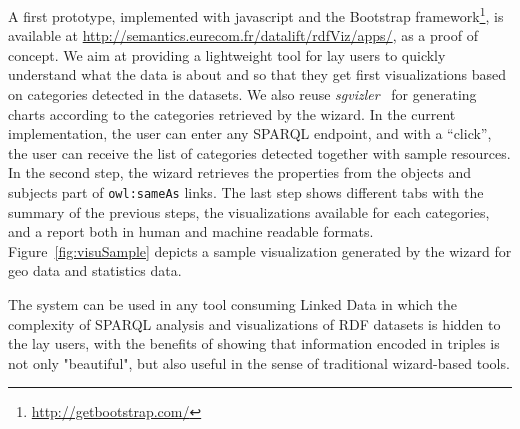 A first prototype, implemented with javascript and the Bootstrap framework\footnote{\url{http://getbootstrap.com/}}, is available at \url{http://semantics.eurecom.fr/datalift/rdfViz/apps/}, as a proof of concept. We aim at providing a lightweight tool for lay users to quickly understand what the data is about and so that they get first visualizations based on categories detected in the datasets. We also reuse \textit{sgvizler}~\cite{Martin2012} for generating charts according to the categories retrieved by the wizard. In the current implementation, the user can enter any SPARQL endpoint, and with a ``click'', the user can receive the list of categories detected together with sample resources. In the second step, the wizard retrieves the properties from the objects and subjects part of \texttt{owl:sameAs} links. The last step shows different tabs with the summary of the previous steps, the visualizations available for each categories, and a report both in human and machine readable formats. Figure~\ref{fig:visuSample} depicts a sample visualization generated by the wizard for geo data and statistics data.

The system can be used in any tool consuming Linked Data in which the complexity of SPARQL analysis and visualizations of RDF datasets is hidden to the lay users, with the benefits of showing that information encoded in triples is not only "beautiful", but also useful in the sense of traditional wizard-based tools.

